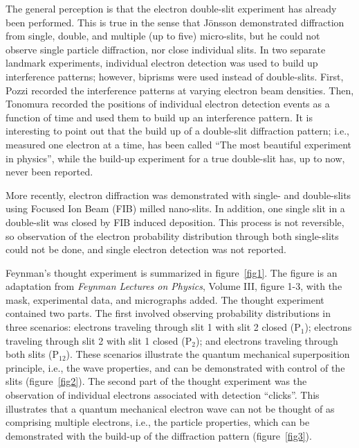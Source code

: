\documentclass[12pt]{iopart}					%
\begin{document}
The general perception is that the electron double-slit experiment has already been performed. This is true in the sense 
that J\"onsson demonstrated diffraction from single, double, and multiple (up to five) micro-slits\cite{Jonsson61}, but he could not
observe single particle diffraction, nor close individual slits. 
In two separate landmark experiments, individual electron detection was used to build up interference patterns;
however, biprisms were used instead of double-slits\cite{Pozzi76,Tonomura89}.
First, Pozzi recorded the interference patterns at varying electron beam densities.
Then, Tonomura recorded the positions of individual electron detection events as a function of time and used them to build up an interference pattern. 
It is interesting to point out that the build up of a double-slit diffraction pattern; i.e., measured one electron at a time, has been called ``The most beautiful experiment in physics''\cite{Beautiful02,DoubleSlit02},
while the build-up experiment for a true double-slit has, up to now, never been reported.

More recently, electron diffraction was demonstrated with single- and double-slits using Focused Ion Beam (FIB) milled nano-slits\cite{Barwick06,Pozzi07}. 
In addition, one single slit in a double-slit was closed by FIB induced deposition\cite{Pozzi08}. 
This process is not reversible, so observation of the electron probability distribution through both single-slits could 
not be done, and single electron detection was not reported.

Feynman's thought experiment is summarized in figure~\ref{fig1}. The figure is an adaptation from \emph{Feynman Lectures on Physics}, Volume III, figure 1-3,
with the mask, experimental data, and micrographs added.
The thought experiment contained two parts.
The first involved observing probability distributions in three scenarios:
electrons traveling through slit 1 with slit 2 closed ($\textrm{P}_{1}$);
electrons traveling through slit 2 with slit 1 closed ($\textrm{P}_{2}$);
and electrons traveling through both slits ($\textrm{P}_{12}$).
These scenarios illustrate the quantum mechanical superposition principle, i.e., the wave properties, and can be demonstrated with control of the slits (figure~\ref{fig2}).
The second part of the thought experiment was the observation of individual electrons associated with detection ``clicks''. 
This illustrates that a quantum mechanical electron wave can not be thought of 
as comprising multiple electrons, i.e., the particle properties, which can be demonstrated with the build-up of the diffraction pattern (figure~\ref{fig3}).
\end{document}
